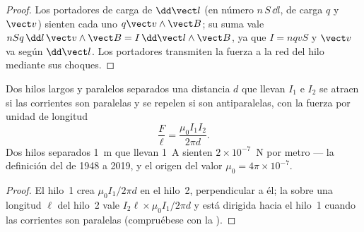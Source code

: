 \begin{proof}
Los portadores de carga de $\dd\vect l$ (en número $n\,S\,\dd l$, de carga
$q$ y  $\vect v$) sienten cada uno
$q\vect v\wedge\vect B$; su suma vale
$nSq\,\dd l\,\vect v\wedge\vect B = I\,\dd\vect l\wedge\vect B$, ya que $I = nqvS$
y $\vect v$ va según $\dd\vect l$. Los portadores transmiten la fuerza a la
red del hilo mediante sus choques.
\end{proof}

\begin{proposition}\label{prop:b1:magnetostatics:parallel}
Dos hilos largos y paralelos separados una distancia $d$ que llevan $I_1$
e $I_2$ se atraen si las corrientes son paralelas y se repelen si son
antiparalelas, con la fuerza por unidad de longitud
\[
\frac{F}{\ell} = \frac{\mu_0I_1I_2}{2\pi d} .
\]
Dos hilos separados \qty{1}{m} que llevan \qty{1}{A} sienten $2 \times 10^{-7}$~N por
metro --- la definición del  de 1948 a 2019, y el origen del valor
$\mu_0 = 4\pi \times 10^{-7}$.
\end{proposition}

\begin{proof}
El hilo~1 crea $\mu_0I_1/2\pi d$ en el hilo~2, perpendicular a él; la
 sobre una longitud $\ell$ del hilo~2 vale $I_2\ell \times \mu_0I_1/2\pi d$
y está dirigida hacia el hilo~1 cuando las corrientes son paralelas
(compruébese con la ).
\end{proof}

